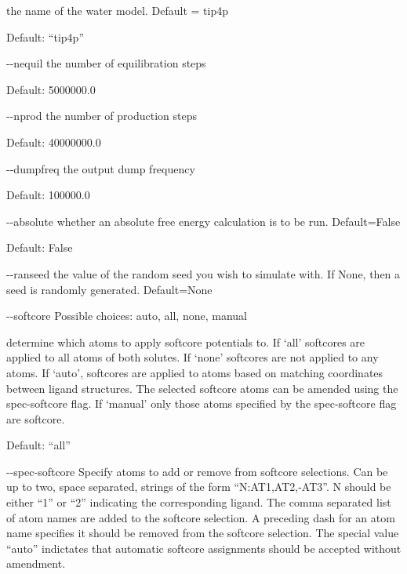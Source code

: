 \documentclass[letterpaper,10pt,english]{sphinxmanual}
\begin{document}
\begin{optionlist}{3cm}
the name of the water model. Default = tip4p

Default: “tip4p”
\item [-{-}nequil]  
the number of equilibration steps

Default: 5000000.0
\item [-{-}nprod]  
the number of production steps

Default: 40000000.0
\item [-{-}dumpfreq]  
the output dump frequency

Default: 100000.0
\item [-{-}absolute]  
whether an absolute free energy calculation is to be run. Default=False

Default: False
\item [-{-}ranseed]  
the value of the random seed you wish to simulate with. If None, then a seed is randomly generated. Default=None
\item [-{-}softcore]  
Possible choices: auto, all, none, manual

determine which atoms to apply softcore potentials to. If ‘all’ softcores are applied to all atoms of both solutes. If ‘none’ softcores are not applied to any atoms. If ‘auto’, softcores are applied to atoms based on matching coordinates between ligand structures. The selected softcore atoms can be amended using the \textendash{}spec-softcore flag. If ‘manual’ only those atoms specified by the \textendash{}spec-softcore flag are softcore.

Default: “all”
\item [-{-}spec-softcore]  
Specify atoms to add or remove from softcore selections. Can be up to two, space separated, strings of the form “N:AT1,AT2,-AT3”. N should be either “1” or “2” indicating the corresponding ligand. The comma separated list of atom names are added to the softcore selection. A preceding dash for an atom name specifies it should be removed from the softcore selection. The special value “auto” indictates that automatic softcore assignments should be accepted without amendment.
\end{optionlist}

\end{document}
